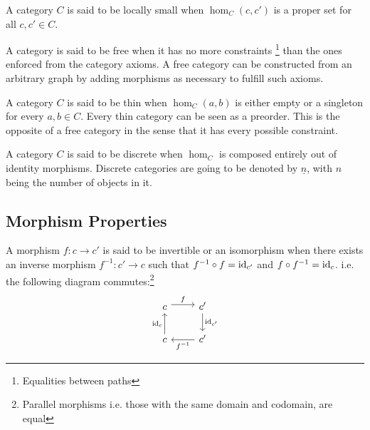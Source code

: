 \begin{definition}
  A category $C$ is said to be locally small when $\hom_C(c, c')$ is a proper
  set for all $c,c'\in C$. \parencite{awodey:category_theory}
\end{definition}

\begin{definition}
  A category is said to be free when it has no more constraints
  \footnote{Equalities between paths} than the ones enforced from the category
  axioms. \parencite{adamek_herrlich_strecker:joy_cats} A free category can be
  constructed from an arbitrary graph by adding morphisms as necessary to
  fulfill such axioms.
\end{definition}

\begin{definition}
  A category $C$ is said to be thin when $\hom_C(a, b)$ is either empty or
  a singleton for every $a,b\in C$.
  \parencite{adamek_herrlich_strecker:joy_cats} Every thin category can be seen
  as a preorder. This is the opposite of a free category in the sense that it
  has every possible constraint.
\end{definition}

\begin{definition}
  A category $C$ is said to be discrete when $\hom_C$ is composed entirely
  out of identity morphisms. \parencite{awodey:category_theory} Discrete
  categories are going to be denoted by $\underline{n}$, with $n$ being the
  number of objects in it.
\end{definition}

\subsection{Morphism Properties}

\begin{definition}[Isomorphism]
  A morphism $f: c\to c'$ is said to be invertible or an isomorphism when there
  exists an inverse morphism $f^{-1}:c'\to c$ such that $f^{-1}\circ f =
  \mathrm{id}_{c'}$ and $f\circ f^{-1} = \mathrm{id}_c$.
  \parencite{maclane:working_mathematician} i.e. the following diagram
  commutes:\footnote{Parallel morphisms i.e. those with the same domain and
  codomain, are equal}
  \[\begin{tikzcd}
    c & {c'} \\
    c & {c'}
    \arrow["f", shift left=1, from=1-1, to=1-2]
    \arrow["{f^{-1}}", from=2-2, to=2-1]
    \arrow["{\mathrm{id}_c}", from=2-1, to=1-1]
    \arrow["{\mathrm{id}_{c'}}", from=1-2, to=2-2]
  \end{tikzcd}\]
\end{definition}

